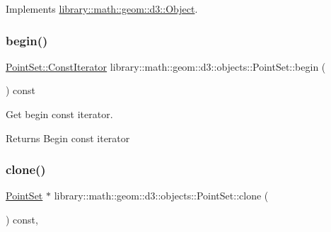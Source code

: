 Implements \hyperlink{classlibrary_1_1math_1_1geom_1_1d3_1_1_object_a5fc47b1ee5d9a28efc6010d3d1512470}{library\+::math\+::geom\+::d3\+::\+Object}.

\mbox{\label{classlibrary_1_1math_1_1geom_1_1d3_1_1objects_1_1_point_set_af81fd640cf4b1804c7c456ce4dbcf2ab}} 
\subsubsection{\texorpdfstring{begin()}{begin()}}
{\footnotesize\ttfamily \hyperlink{classlibrary_1_1math_1_1geom_1_1d3_1_1objects_1_1_point_set_a7b7fade95484b653ec27ad082ffc8064}{Point\+Set\+::\+Const\+Iterator} library\+::math\+::geom\+::d3\+::objects\+::\+Point\+Set\+::begin (\begin{DoxyParamCaption}{ }\end{DoxyParamCaption}) const}



Get begin const iterator. 

\begin{DoxyReturn}{Returns}
Begin const iterator 
\end{DoxyReturn}
\mbox{\label{classlibrary_1_1math_1_1geom_1_1d3_1_1objects_1_1_point_set_ab7c4ec1d48795973be648f0907b84484}} 
\subsubsection{\texorpdfstring{clone()}{clone()}}
{\footnotesize\ttfamily \hyperlink{classlibrary_1_1math_1_1geom_1_1d3_1_1objects_1_1_point_set}{Point\+Set} $\ast$ library\+::math\+::geom\+::d3\+::objects\+::\+Point\+Set\+::clone (\begin{DoxyParamCaption}{ }\end{DoxyParamCaption}) const\hspace{0.3cm}{\ttfamily [override]}, {\ttfamily [virtual]}}




